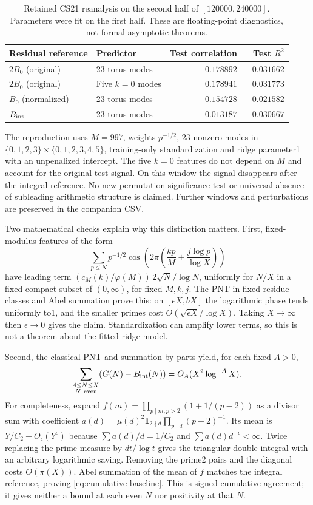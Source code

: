 \documentclass[11pt,a4paper]{article}
\theoremstyle{definition}
\theoremstyle{remark}
\newcommand{\ind}{\mathbf1}
\begin{document}
\begin{table}[htbp]\centering\small
\begin{tabular}{@{}llrr@{}}\toprule
Residual reference & Predictor & Test correlation & Test $R^2$\\\midrule
$2B_0$ (original) & 23 torus modes & $0.178892$ & $0.031662$\\
$2B_0$ (original) & Five $k=0$ modes & $0.178941$ & $0.031773$\\
$B_0$ (normalized) & 23 torus modes & $0.154728$ & $0.021582$\\
$B_{\rm int}$ & 23 torus modes & $-0.013187$ & $-0.030667$\\\bottomrule
\end{tabular}
\caption{Retained CS21 reanalysis on the second half of $[120000,240000]$. Parameters were fit on the first half. These are floating-point diagnostics, not formal asymptotic theorems.}\label{tab:cs21}
\end{table}
The reproduction uses $M=997$, weights $p^{-1/2}$, 23 nonzero modes in $\{0,1,2,3\}\times\{0,1,2,3,4,5\}$, training-only standardization and ridge parameter1 with an unpenalized intercept. The five $k=0$ features do not depend on $M$ and account for the original test signal. On this window the signal disappears after the integral reference. No new permutation-significance test or universal absence of subleading arithmetic structure is claimed. Further windows and perturbations are preserved in the companion CSV.

Two mathematical checks explain why this distinction matters. First, fixed-modulus features of the form
\[\sum_{p\le N}p^{-1/2}\cos\left(2\pi\left(\frac{kp}{M}+\frac{j\log p}{\log X}\right)\right)\]
have leading term $(c_M(k)/\varphi(M))\,2\sqrt N/\log N$, uniformly for $N/X$ in a fixed compact subset of $(0,\infty)$, for fixed $M,k,j$. The PNT in fixed residue classes and Abel summation prove this: on $[\epsilon X,bX]$ the logarithmic phase tends uniformly to1, and the smaller primes cost $O(\sqrt{\epsilon X}/\log X)$. Taking $X\to\infty$ then $\epsilon\to0$ gives the claim. Standardization can amplify lower terms, so this is not a theorem about the fitted ridge model.

Second, the classical PNT and summation by parts yield, for each fixed $A>0$,
\begin{equation}\label{eq:cumulative-baseline}
 \sum_{\substack{4\le N\le X\\N\ {\rm even}}}(G(N)-B_{\rm int}(N))
 =O_A(X^2\log^{-A}X).
\end{equation}
For completeness, expand $f(m)=\prod_{p\mid m,p>2}(1+1/(p-2))$ as a divisor sum with coefficient $a(d)=\mu(d)^2\ind_{2\nmid d}\prod_{p\mid d}(p-2)^{-1}$. Its mean is $Y/C_2+O_\epsilon(Y^\epsilon)$ because $\sum a(d)/d=1/C_2$ and $\sum a(d)d^{-\epsilon}<\infty$. Twice replacing the prime measure by $dt/\log t$ gives the triangular double integral with an arbitrary logarithmic saving. Removing the prime2 pairs and the diagonal costs $O(\pi(X))$. Abel summation of the mean of $f$ matches the integral reference, proving \eqref{eq:cumulative-baseline}. This is signed cumulative agreement; it gives neither a bound at each even $N$ nor positivity at that $N$.
\end{document}
